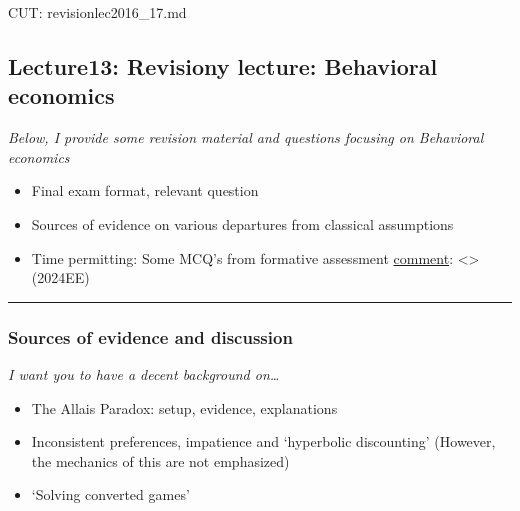 \documentclass[]{article}
\providecommand{\tightlist}{%
  \setlength{\itemsep}{0pt}\setlength{\parskip}{0pt}}
\begin{document}
CUT: revisionlec2016\_17.md

\hypertarget{lecture13-revisiony-lecture-behavioral-economics}{%
\subsection{Lecture13: Revisiony lecture: Behavioral
economics}\label{lecture13-revisiony-lecture-behavioral-economics}}

\emph{Below, I provide some revision material and questions focusing on
Behavioral economics}

\begin{itemize}
\item
  Final exam format, relevant question
\item
  Sources of evidence on various departures from classical assumptions
\end{itemize}

\begin{itemize}
\tightlist
\item
  Time permitting: Some MCQ's from formative assessment
  \href{}{comment}: \textless\textgreater{} (2024EE)
\end{itemize}

\begin{center}\rule{0.5\linewidth}{\linethickness}\end{center}

\hypertarget{sources-of-evidence-and-discussion}{%
\subsubsection{Sources of evidence and
discussion}\label{sources-of-evidence-and-discussion}}

\emph{I want you to have a decent background on\ldots{}}

\begin{itemize}
\tightlist
\item
  The Allais Paradox: setup, evidence, explanations
\end{itemize}

\bigskip

\begin{itemize}
\tightlist
\item
  Inconsistent preferences, impatience and `hyperbolic discounting'
  (However, the mechanics of this are not emphasized)
\end{itemize}

\begin{itemize}
\tightlist
\item
  `Solving converted games'
\end{itemize}
\end{document}
